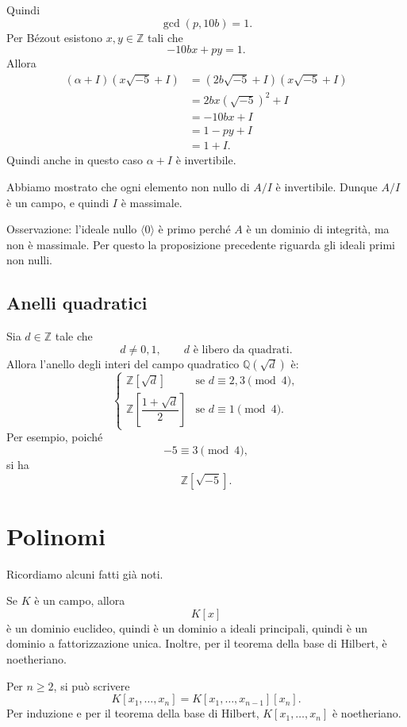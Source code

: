 \documentclass[a4paper]{article}
\begin{document}
\begin{radioactive}
\begin{snippetproof}{}
    Quindi
    \[
        \gcd(p,10b)=1.
    \]
    Per Bézout esistono \(x,y\in\mathbb{Z}\) tali che
    \[
        -10bx+py=1.
    \]
    Allora
    \begin{align*}
        (\alpha+I)(x\sqrt{-5}+I)
        &=
        (2b\sqrt{-5}+I)(x\sqrt{-5}+I) \\
        &=
        2bx(\sqrt{-5})^2+I \\
        &=
        -10bx+I \\
        &=
        1-py+I \\
        &=
        1+I.
    \end{align*}
    Quindi anche in questo caso \(\alpha+I\) è invertibile.

    Abbiamo mostrato che ogni elemento non nullo di \(A/I\) è invertibile. Dunque \(A/I\) è un campo, e quindi \(I\) è massimale.
\end{snippetproof}
\end{radioactive}

\begin{radioactive}
Osservazione: l'ideale nullo \(\langle 0 \rangle\) è primo perché \(A\) è un dominio di integrità, ma non è massimale. Per questo la proposizione precedente riguarda gli ideali primi non nulli.
\end{radioactive}

\subsection{Anelli quadratici}

\begin{radioactive}
Sia \(d\in\mathbb{Z}\) tale che
\[
    d\neq 0,1,
    \qquad
    d \text{ è libero da quadrati}.
\]
Allora l'anello degli interi del campo quadratico \(\mathbb{Q}(\sqrt{d})\) è:
\[
    \begin{cases}
        \mathbb{Z}[\sqrt{d}]
        & \text{se } d\equiv 2,3 \pmod 4,\\[4pt]
        \mathbb{Z}\left[\dfrac{1+\sqrt{d}}{2}\right]
        & \text{se } d\equiv 1 \pmod 4.
    \end{cases}
\]
Per esempio, poiché
\[
    -5\equiv 3\pmod 4,
\]
si ha
\[
    \mathbb{Z}[\sqrt{-5}].
\]
\end{radioactive}

\section{Polinomi}

\begin{radioactive}
Ricordiamo alcuni fatti già noti.

Se \(K\) è un campo, allora
\[
    K[x]
\]
è un dominio euclideo, quindi è un dominio a ideali principali, quindi è un dominio a fattorizzazione unica.
Inoltre, per il teorema della base di Hilbert, è noetheriano.

Per \(n\geq 2\), si può scrivere
\[
    K[x_1,\ldots,x_n]
    =
    K[x_1,\ldots,x_{n-1}][x_n].
\]
Per induzione e per il teorema della base di Hilbert, \(K[x_1,\ldots,x_n]\) è noetheriano.
\end{radioactive}
\end{document}
